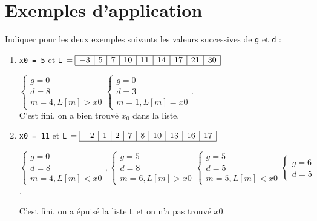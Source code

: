 \section{ Exemples d'application}
Indiquer pour les deux exemples suivants les valeurs successives de \texttt{g} et \texttt{d} :
\begin{enumerate}
\item \texttt{x0 = 5} et \texttt{L} $= \begin{array}{|c|c|c|c|c|c|c|c|c|} 
\hline -3 & 5 & 7 & 10 & 11 & 14 & 17 & 21 & 30 \\ \hline
\end{array}$


$\begin{cases}
g=0\\d=8\\m=4,L[m]>x0
\end{cases}
\begin{cases}
g=0\\d=3\\m=1,L[m]=x0
\end{cases}$.\\
C'est fini, on a bien trouvé $x_0$ dans la liste.


\item \texttt{x0 = 11} et \texttt{L} $= \begin{array}{|c|c|c|c|c|c|c|c|c|} 
\hline -2 & 1 & 2 & 7 & 8 & 10 & 13 & 16 & 17  \\ \hline
\end{array}$


$\begin{cases}
g=0\\d=8\\m=4,L[m]<x0
\end{cases},\begin{cases}
g=5\\d=8\\m=6,L[m]>x0
\end{cases}\begin{cases}
g=5\\d=5\\m=5,L[m]<x0
\end{cases}\begin{cases}
g=6\\d=5
\end{cases}$.

C'est fini, on a épuisé la liste \texttt{L} et on n'a pas trouvé $x0$.
\end{enumerate}


